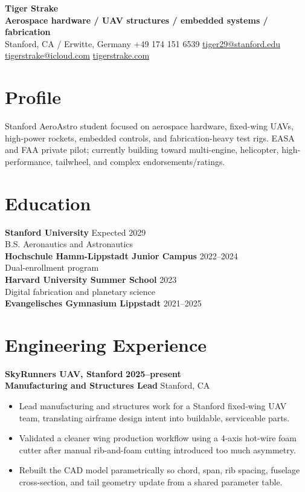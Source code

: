 \documentclass[10pt,letterpaper]{article}
\newcommand{\role}[4]{
  \textbf{#1} \hfill {\color{muted}\textbf{#4}}\\
  {\color{accent}\textbf{#2}} \hfill {\color{muted}#3}
  \vspace{2pt}
}
\begin{document}
{\Huge\bfseries Tiger Strake}\\[3pt]
{\color{accent}\textbf{Aerospace hardware / UAV structures / embedded systems / fabrication}}\\[4pt]
Stanford, CA / Erwitte, Germany \quad
+49 174 151 6539 \quad
\href{mailto:tiger29@stanford.edu}{tiger29@stanford.edu} \quad
\href{mailto:tigerstrake@icloud.com}{tigerstrake@icloud.com} \quad
\href{https://tigerstrake.com}{tigerstrake.com}

\section{Profile}
Stanford AeroAstro student focused on aerospace hardware, fixed-wing UAVs, high-power rockets, embedded controls, and fabrication-heavy test rigs. EASA and FAA private pilot; currently building toward multi-engine, helicopter, high-performance, tailwheel, and complex endorsements/ratings.

\section{Education}
\textbf{Stanford University} \hfill {\color{muted}Expected 2029}\\
B.S. Aeronautics and Astronautics\\[2pt]
\textbf{Hochschule Hamm-Lippstadt Junior Campus} \hfill {\color{muted}2022--2024}\\
Dual-enrollment program\\[2pt]
\textbf{Harvard University Summer School} \hfill {\color{muted}2023}\\
Digital fabrication and planetary science\\[2pt]
\textbf{Evangelisches Gymnasium Lippstadt} \hfill {\color{muted}2021--2025}

\section{Engineering Experience}
\role{SkyRunners UAV, Stanford}{Manufacturing and Structures Lead}{Stanford, CA}{2025--present}
\begin{itemize}
  \item Lead manufacturing and structures work for a Stanford fixed-wing UAV team, translating airframe design intent into buildable, serviceable parts.
  \item Validated a cleaner wing production workflow using a 4-axis hot-wire foam cutter after manual rib-and-foam cutting introduced too much asymmetry.
  \item Rebuilt the CAD model parametrically so chord, span, rib spacing, fuselage cross-section, and tail geometry update from a shared parameter table.
\end{itemize}
\end{document}
